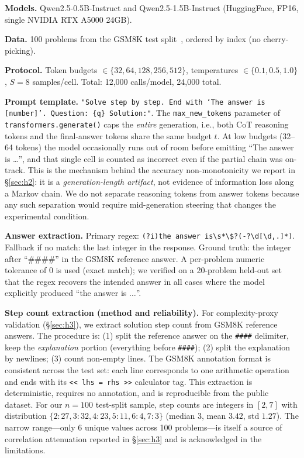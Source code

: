 \documentclass{article}
\begin{document}
\textbf{Models.}  Qwen2.5-0.5B-Instruct and Qwen2.5-1.5B-Instruct (HuggingFace, FP16, single NVIDIA RTX A5000 24GB).

\textbf{Data.}  100 problems from the GSM8K test split~\citep{cobbe2021gsm8k}, ordered by index (no cherry-picking).

\textbf{Protocol.}  Token budgets $\in \{32, 64, 128, 256, 512\}$, temperatures $\in \{0.1, 0.5, 1.0\}$, $S{=}8$ samples/cell.  Total: 12{,}000 calls/model, 24{,}000 total.

\textbf{Prompt template.} \texttt{"Solve step by step. End with `The answer is [number]'. Question: \{q\} Solution:"}.  The \texttt{max\_new\_tokens} parameter of \texttt{transformers.generate()} caps the \emph{entire} generation, i.e., both CoT reasoning tokens and the final-answer tokens share the same budget $t$.  At low budgets (32--64 tokens) the model occasionally runs out of room before emitting ``The answer is \ldots'', and that single cell is counted as incorrect even if the partial chain was on-track.  This is the mechanism behind the accuracy non-monotonicity we report in \S\ref{sec:h2}: it is a \emph{generation-length artifact}, not evidence of information loss along a Markov chain.  We do not separate reasoning tokens from answer tokens because any such separation would require mid-generation steering that changes the experimental condition.

\textbf{Answer extraction.}  Primary regex: \texttt{(?i)the answer is\textbackslash s*\textbackslash\$?(-?\textbackslash d[\textbackslash d,.]*)}.  Fallback if no match: the last integer in the response.  Ground truth: the integer after ``\#\#\#\#'' in the GSM8K reference answer.  A per-problem numeric tolerance of $0$ is used (exact match); we verified on a 20-problem held-out set that the regex recovers the intended answer in all cases where the model explicitly produced ``the answer is $\ldots$''.

\textbf{Step count extraction (method and reliability).}  For complexity-proxy validation (\S\ref{sec:h3}), we extract solution step count from GSM8K reference answers.  The procedure is: (1) split the reference answer on the \texttt{\#\#\#\#} delimiter, keep the \emph{explanation} portion (everything before \texttt{\#\#\#\#}); (2) split the explanation by newlines; (3) count non-empty lines.  The GSM8K annotation format is consistent across the test set: each line corresponds to one arithmetic operation and ends with its \texttt{<<\,lhs\,=\,rhs\,>>} calculator tag.  This extraction is deterministic, requires no annotation, and is reproducible from the public dataset.  For our $n{=}100$ test-split sample, step counts are integers in $[2, 7]$ with distribution $\{2{:}27, 3{:}32, 4{:}23, 5{:}11, 6{:}4, 7{:}3\}$ (median $3$, mean $3.42$, std $1.27$).  The narrow range---only 6 unique values across 100 problems---is itself a source of correlation attenuation reported in \S\ref{sec:h3} and is acknowledged in the limitations.
\end{document}
